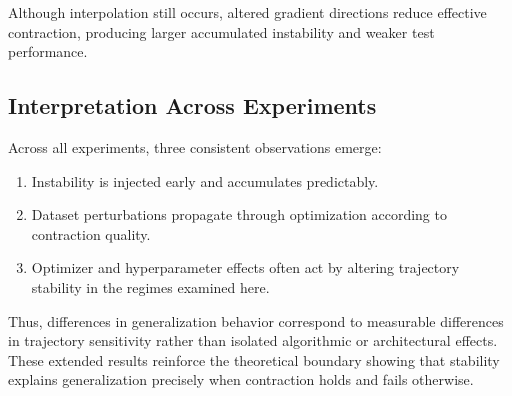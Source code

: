 \documentclass{article}
\numberwithin{equation}{section}
\begin{document}
Although interpolation still occurs, altered gradient directions reduce effective contraction, producing larger accumulated instability and weaker test performance.

\subsection{Interpretation Across Experiments}

Across all experiments, three consistent observations emerge:

\begin{enumerate}
	\item Instability is injected early and accumulates predictably.
	\item Dataset perturbations propagate through optimization according to contraction quality.
	\item Optimizer and hyperparameter effects often act by altering trajectory stability in the regimes examined here.
\end{enumerate}

Thus, differences in generalization behavior correspond to measurable differences in trajectory sensitivity rather than isolated algorithmic or architectural effects. These extended results reinforce the theoretical boundary showing that stability explains generalization precisely when contraction holds and fails otherwise.
\end{document}
